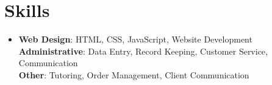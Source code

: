 \documentclass[letterpaper,11pt]{article}
\begin{document}
\section{Skills}
\begin{itemize}[leftmargin=0.15in, label={}]
\item{
\textbf{Web Design}{: HTML, CSS, JavaScript, Website Development} \\
\textbf{Administrative}{: Data Entry, Record Keeping, Customer Service, Communication} \\
\textbf{Other}{: Tutoring, Order Management, Client Communication}
} \\
\end{itemize}


\end{document}
